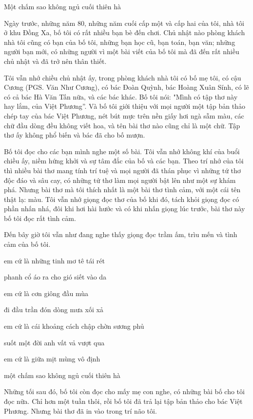 Một chấm sao không ngủ cuối thiên hà

Ngày trước, những năm 80, những năm cuối cấp một và cấp hai của tôi, nhà tôi ở khu Đồng Xa, bố tôi có rất nhiều bạn bè đến chơi. Chủ nhật nào phòng khách nhà tôi cũng có bạn của bố tôi, những bạn học cũ, bạn toán, bạn văn; những người bạn mới, có những người vì một bài viết của bố tôi mà đã đến rất nhiều chủ nhật và đã trở nên thân thiết.

Tôi vẫn nhớ chiều chủ nhật ấy, trong phòng khách nhà tôi có bố mẹ tôi, có cậu Cương (PGS. Văn Như Cương), có bác Đoàn Quỳnh, bác Hoàng Xuân Sính, có lẽ có cả bác Hà Văn Tấn nữa, và các bác khác. Bố tôi nói: "Mình có tập thơ này hay lắm, của Việt Phương”. Và bố tôi giới thiệu với mọi người một tập bản thảo chép tay của bác Việt Phương, nét bút mực trên nền giấy hơi ngà sẫm màu, các chữ đầu dòng đều không viết hoa, và tên bài thơ nào cũng chỉ là một chữ. Tập thơ ấy không phổ biến và bác đã cho bố mượn.

Bố tôi đọc cho các bạn mình nghe một số bài. Tôi vẫn nhớ không khí của buổi chiều ấy, niềm hứng khởi và sự tâm đắc của bố và các bạn. Theo trí nhớ của tôi thì nhiều bài thơ mang tính trí tuệ và mọi người đã thán phục vì những tứ thơ độc đáo và sâu cay, có những tứ thơ làm mọi người bật lên như một sự khám phá. Nhưng bài thơ mà tôi thích nhất là một bài thơ tình cảm, với một cái tên thật lạ: màu. Tôi vẫn nhớ giọng đọc thơ của bố khi đó, tách khỏi giọng đọc có phần nhấn nhá, đôi khi hơi hài hước và có khi nhấn giọng lúc trước, bài thơ này bố tôi đọc rất tình cảm.

Đến bây giờ tôi vẫn như đang nghe thấy giọng đọc trầm ấm, trìu mến và tình cảm của bố tôi.

em cứ là những tinh mơ tê tái rét

phanh cổ áo ra cho gió siết vào da

em cứ là cơn giông đầu mùa

đi đầu trần đón dòng mưa xối xả

em cứ là cái khoảng cách chập chờn sương phủ

suốt một đời anh vất vả vượt qua

em cứ là giữa mịt mùng vô định

một chấm sao không ngủ cuối thiên hà  

Những tối sau đó, bố tôi còn đọc cho mấy mẹ con nghe, có những bài bố cho tôi đọc nữa. Chỉ hơn một tuần thôi, rồi bố tôi đã trả lại tập bản thảo cho bác Việt Phương. Nhưng bài thơ đã in vào trong trí não tôi.

